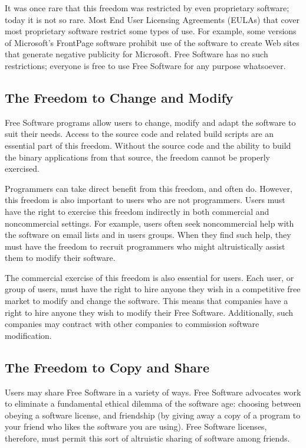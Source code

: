 \documentclass[11pt, letterpaper]{book}
\begin{document}
It was once rare that this freedom was restricted by even proprietary
software; today it is not so rare. Most End User Licensing Agreements
(EULAs) that cover most proprietary software restrict some types of
use.  For example, some versions of Microsoft's FrontPage software
prohibit use of the software to create Web sites that generate
negative publicity for Microsoft. Free Software has no such
restrictions; everyone is free to use Free Software for any purpose
whatsoever.

\subsection{The Freedom to Change and Modify}

Free Software programs allow users to change, modify and adapt the
software to suit their needs. Access to the source code and related build
scripts are an essential part of this freedom. Without the source code
and the ability to build the binary applications from that source, the
freedom cannot be properly exercised.

Programmers can take direct benefit from this freedom, and often do.
However, this freedom is also important to users who are not programmers.
Users must have the right to exercise this freedom indirectly in both
commercial and noncommercial settings. For example, users often seek
noncommercial help with the software on email lists and in users groups.
When they find such help, they must have the freedom to recruit
programmers who might altruistically assist them to modify their software.

The commercial exercise of this freedom is also essential for users. Each
user, or group of users, must have the right to hire anyone they wish in a
competitive free market to modify and change the software. This means
that companies have a right to hire anyone they wish to modify their Free
Software. Additionally, such companies may contract with other companies
to commission software modification.

\subsection{The Freedom to Copy and Share}

Users may share Free Software in a variety of ways. Free Software
advocates work to eliminate a fundamental ethical dilemma of the software
age: choosing between obeying a software license, and friendship (by
giving away a copy of a program to your friend who likes the software you are
using). Free Software licenses, therefore, must permit this sort of
altruistic sharing of software among friends.
\end{document}
